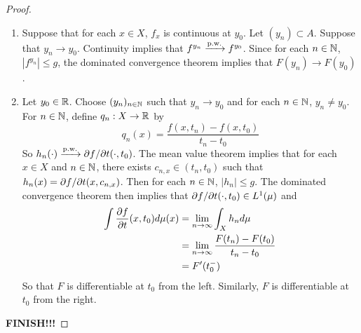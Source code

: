 \documentclass{book}
\begin{document}
	\begin{proof}\
	\begin{enumerate}
	\item Suppose that for each $x \in X$, $f_x$ is continuous at $y_0$. Let $(y_n) \subset A$. Suppose that $y_n \rightarrow y_0$. Continuity implies that $f^{y_n} \xrightarrow{\text{p.w.}} f^{y_0}$. Since for each $n \in \mathbb{N}$, $|f^{y_n}| \leq g$, the dominated convergence theorem implies that $F(y_n) \rightarrow F(y_0)$.
	\item Let $y_0 \in \mathbb{R}$. Choose $(y_n)_{n \in \mathbb{N}}$ such that $ y_n \rightarrow y_0$ and for each $n \in \mathbb{N}$, $y_n \neq y_0$. For $n \in \mathbb{N}$, define $q_n:X \rightarrow \mathbb{R}$ by 
	$$q_n(x) = \frac{f(x,t_n) - f(x, t_0)}{t_n - t_0}$$ So $h_n(\cdot) \xrightarrow{\text{p.w.}} \partial f / \partial t (\cdot, t_0)$. The mean value theorem implies that for each $x \in X$ and $n \in \mathbb{N}$, there exists $c_{n,x} \in (t_n,t_0)$ such that $h_n(x) = \partial f / \partial t (x, c_{n,x})$. Then for each $n \in \mathbb{N}$, $|h_n| \leq g$. The dominated convergence theorem then implies that $\partial f / \partial t (\cdot, t_0) \in L^1(\mu)$ and 
	\begin{align*}
	\int \frac{\partial f }{\partial t} (x, t_0) d\mu(x) 
	&=  \lim \limits_{n \rightarrow \infty} \int_X h_n d\mu  \\
	&= \lim \limits_{n \rightarrow \infty} \frac{F(t_n) - F(t_0)}{t_n - t_0} \\
	&= F'(t_0^-) 	
	\end{align*}
	So that $F$ is differentiable at $t_0$ from the left. Similarly, $F$ is differentiable at $t_0$ from the right. 
	\end{enumerate}
	\textbf{FINISH!!!}
	\end{proof}





















	




















	
	
\end{document}
